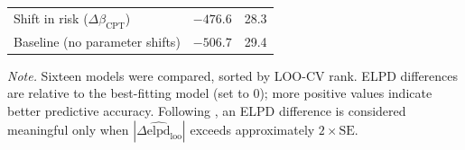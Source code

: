 \documentclass[man,floatsintext]{apa7}
\begin{document}
\begin{table}[!htbp]
\begin{threeparttable}
\begin{tabularx}{\linewidth}{@{} >{\raggedright\arraybackslash}X rr @{}}
Shift in risk ($\Delta\beta_{\text{CPT}}$) & $-476.6$ & 28.3 \\
Baseline (no parameter shifts) & $-506.7$ & 29.4 \\
\bottomrule
\end{tabularx}
\begin{tablenotes}
\item \textit{Note.} Sixteen models were compared, sorted by LOO-CV rank. ELPD differences are relative to the best-fitting model (set to 0); more positive values indicate better predictive accuracy. Following \textcite{vehtari_practical_2017}, an ELPD difference is considered meaningful only when $|\Delta\widehat{\mathrm{elpd}}_{\mathrm{loo}}|$ exceeds approximately $2 \times \mathrm{SE}$. 
\end{tablenotes}
\end{threeparttable}
\end{table}
\end{document}
